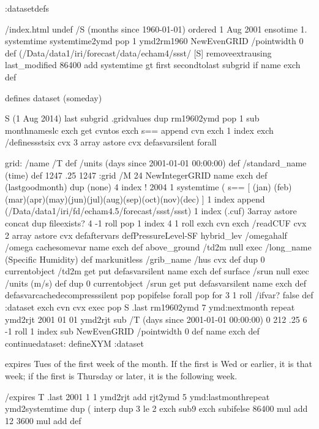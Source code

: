 \begin{ingrid}
:datasetdefs

/index.html undef
/S (months since 1960-01-01) ordered
1 Aug 2001 ensotime
1.
systemtime systemtime2ymd pop 1
ymd2rm1960
NewEvenGRID
/pointwidth 0 def
{
(/Data/data1/iri/forecast/data/echam4/ssst/%
[S]
} removeextrausing
last_modified 86400 add
systemtime gt 
{ first secondtolast subgrid} if
name exch def
\end{ingrid}
defines dataset (someday)
\begin{ingrid}
S (1 Aug 2014) last subgrid .gridvalues
{
dup rm19602ymd pop
1 sub monthnameslc exch get cvntos exch s== append cvn exch 1 index exch /definessstsix cvx 3 array astore cvx defasvarsilent
} forall
\end{ingrid}
\begin{ingrid}
grid:
/name /T def
/units (days since 2001-01-01 00:00:00) def
/standard_name (time) def
1247 .25 1247
:grid
/M 24 NewIntegerGRID name exch def
(lastgoodmonth)  dup (none) 4 index !
2004 1 
systemtime (%
{
s==
[ (jan) (feb) (mar)(apr)(may)(jun)(jul)(aug)(sep)(oct)(nov)(dec) ]
{
1 index append 
(/Data/data1/iri/fd/echam4.5/forecast/ssst/ssst) 1 index (.cuf) 3array astore concat
dup fileexists?
{
4 -1 roll pop 1 index 4 1 roll
 exch cvn exch /readCUF cvx 2 array astore cvx 
{
defaftervars
defPressureLevel-SF
hybrid_lev /omegahalf /omega cachesomevar
name exch def
above_ground
/td2m
{null  exec
  /long_name (Specific Humidity) def
  markunitless
/grib_name /hus cvx def
}
dup 0 currentobject 
/td2m get
put
defasvarsilent
name exch def
surface
/srun
{null  exec
/units (m/s) def
}
dup 0 currentobject 
/srun get
put
defasvarsilent
name exch def
} defasvarcachedecompresssilent
} 
{pop pop}ifelse
} forall
pop
} for
3 1 roll
/ifvar? false def
:dataset
exch
cvn cvx exec
pop
S .last
rm19602ymd 
7 {ymd:nextmonth} repeat
ymd2rjt
2001 01 01 ymd2rjt sub
/T
(days since 2001-01-01 00:00:00)
0
212 .25 6 -1 roll 1 index sub
NewEvenGRID 
/pointwidth 0 def
name exch def
continuedataset:
defineXYM
:dataset
\end{ingrid}
expires Tues of the first week of the month.  If the first is Wed or earlier, it is that week; if the first is Thursday or later, it is the following week.
\begin{ingrid}
/expires T .last
    2001
     1 1 ymd2rjt
     add
    rjt2ymd
      5 {ymd:lastmonth}repeat
      ymd2systemtime
    dup
     (%
     interp
     dup
      3 le
      {2 exch sub}{9 exch sub}ifelse
     86400 mul
     add
    12
     3600 mul
     add
    def
\end{ingrid}



